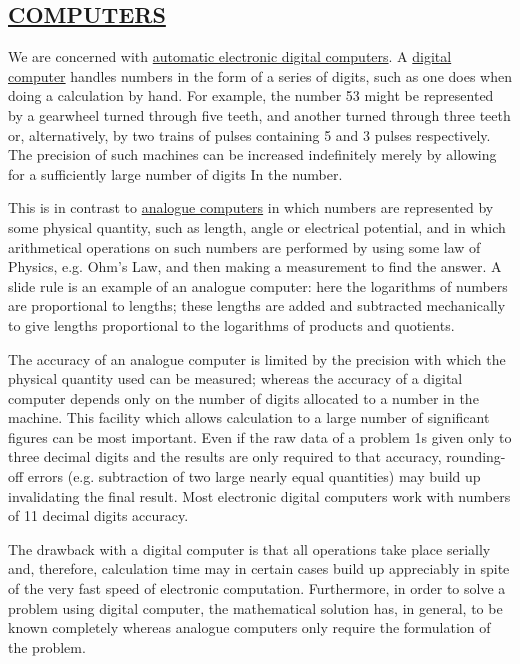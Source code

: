 \documentclass[10pt, a4paper, oneside]{article}
\newcommand{\myuline}[1]{\uline{#1}}
\begin{document}
\begin{multicols}{2}

\section{\myuline{COMPUTERS}}

We are concerned with \myuline{automatic electronic digital computers}.
A \myuline{digital computer} handles numbers
in the form of a series of digits, such as
one does when doing a calculation by hand.  For
example, the number 53 might be represented by a gearwheel
turned through five teeth, and another turned
through three teeth or, alternatively, by two trains
of pulses containing 5 and 3 pulses respectively.
The precision of such machines can be increased
indefinitely merely by allowing for a sufficiently
large number of digits In the number.

This is in contrast to \myuline{analogue computers} in
which numbers are represented by some physical
quantity, such as length, angle or electrical
potential, and in which arithmetical operations on
such numbers are performed by using some law of
Physics, e.g. Ohm's Law, and then making a measurement
to find the answer.  A slide rule is an example
of an analogue computer: here the logarithms of
numbers are proportional to lengths; these lengths
are added and subtracted mechanically to give lengths
proportional to the logarithms of products and
quotients.

The accuracy of an analogue computer is limited by
the precision with which the physical quantity used can
be measured; whereas the accuracy of a digital computer
depends only on the number of digits allocated to a
number in the machine. This facility which allows
calculation to a large number of significant figures can
be most important.  Even if the raw data of a problem
1s given only to three decimal digits and the results
are only required to that accuracy, rounding-off errors
(e.g. subtraction of two large nearly equal quantities)
may build up invalidating the final result.  Most
electronic digital computers work with numbers of 11
decimal digits accuracy.

The drawback with a digital computer is that all
operations take place serially and, therefore, calculation
time may in certain cases build up appreciably in
spite of the very fast speed of electronic computation.
Furthermore, in order to solve a problem using
digital computer, the mathematical solution has, in
general, to be known completely whereas analogue computers
only require the formulation of the problem.


\end{multicols}
\end{document}
